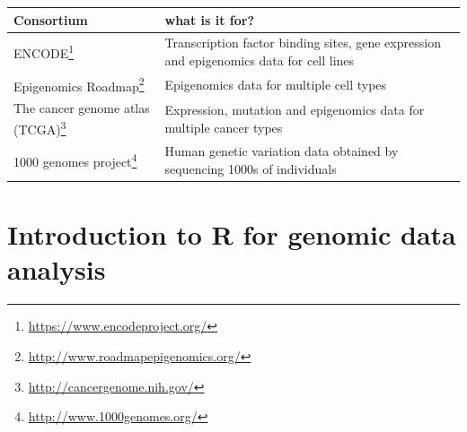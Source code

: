 \documentclass[12pt,]{krantz}
\renewcommand{\href}[2]{#2\footnote{\url{#1}}}
\theoremstyle{definition}
\theoremstyle{definition}
\theoremstyle{definition}
\theoremstyle{remark}
\begin{document}
\begin{longtable}[]{@{}ll@{}}
\toprule
\begin{minipage}[b]{0.32\columnwidth}\raggedright
Consortium\strut
\end{minipage} & \begin{minipage}[b]{0.62\columnwidth}\raggedright
what is it for?\strut
\end{minipage}\tabularnewline
\midrule
\endhead
\begin{minipage}[t]{0.32\columnwidth}\raggedright
\href{https://www.encodeproject.org/}{ENCODE}\strut
\end{minipage} & \begin{minipage}[t]{0.62\columnwidth}\raggedright
Transcription factor binding sites, gene expression and epigenomics data
for cell lines\strut
\end{minipage}\tabularnewline
\begin{minipage}[t]{0.32\columnwidth}\raggedright
\href{http://www.roadmapepigenomics.org/}{Epigenomics Roadmap}\strut
\end{minipage} & \begin{minipage}[t]{0.62\columnwidth}\raggedright
Epigenomics data for multiple cell types\strut
\end{minipage}\tabularnewline
\begin{minipage}[t]{0.32\columnwidth}\raggedright
\href{http://cancergenome.nih.gov/}{The cancer genome atlas
(TCGA)}\strut
\end{minipage} & \begin{minipage}[t]{0.62\columnwidth}\raggedright
Expression, mutation and epigenomics data for multiple cancer
types\strut
\end{minipage}\tabularnewline
\begin{minipage}[t]{0.32\columnwidth}\raggedright
\href{http://www.1000genomes.org/}{1000 genomes project}\strut
\end{minipage} & \begin{minipage}[t]{0.62\columnwidth}\raggedright
Human genetic variation data obtained by sequencing 1000s of
individuals\strut
\end{minipage}\tabularnewline
\bottomrule
\end{longtable}

\hypertarget{Rintro}{%
\chapter{Introduction to R for genomic data analysis}\label{Rintro}}
\end{document}
